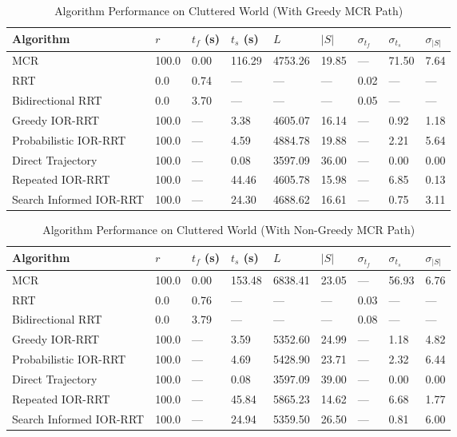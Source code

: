 \begin{table}[h!]
\centering
\begin{tabular}{@{}lllllllll@{}}
\toprule
Algorithm & $r$ & $t_f$ (s) & $t_s$ (s) & $L$ & $|S|$ & $\sigma_{t_f}$ & $\sigma_{t_s}$ & $\sigma_{|S|}$ \\
\midrule
MCR & 100.0 & 0.00 & 116.29 & 4753.26 & 19.85 & --- & 71.50 & 7.64 \\
RRT & 0.0 & 0.74 & --- & --- & --- & 0.02 & --- & --- \\
Bidirectional RRT & 0.0 & 3.70 & --- & --- & --- & 0.05 & --- & --- \\
Greedy IOR-RRT & 100.0 & --- & 3.38 & 4605.07 & 16.14 & --- & 0.92 & 1.18 \\
Probabilistic IOR-RRT & 100.0 & --- & 4.59 & 4884.78 & 19.88 & --- & 2.21 & 5.64 \\
Direct Trajectory & 100.0 & --- & 0.08 & 3597.09 & 36.00 & --- & 0.00 & 0.00 \\
Repeated IOR-RRT & 100.0 & --- & 44.46 & 4605.78 & 15.98 & --- & 6.85 & 0.13 \\
Search Informed IOR-RRT & 100.0 & --- & 24.30 & 4688.62 & 16.61 & --- & 0.75 & 3.11 \\
\bottomrule
\end{tabular}
\caption{Algorithm Performance on Cluttered World (With Greedy MCR Path)}
\label{tab:cluttered_world}
\end{table}

\begin{table}[h!]
\centering
\begin{tabular}{@{}lllllllll@{}}
\toprule
Algorithm & $r$ & $t_f$ (s) & $t_s$ (s) & $L$ & $|S|$ & $\sigma_{t_f}$ & $\sigma_{t_s}$ & $\sigma_{|S|}$ \\
\midrule
MCR & 100.0 & 0.00 & 153.48 & 6838.41 & 23.05 & --- & 56.93 & 6.76\\
RRT & 0.0 & 0.76 & --- & --- & --- & 0.03 & --- & --- \\
Bidirectional RRT & 0.0 & 3.79 & --- & --- & --- & 0.08 & --- & --- \\
Greedy IOR-RRT & 100.0 & --- & 3.59 & 5352.60 & 24.99 & --- & 1.18 & 4.82 \\
Probabilistic IOR-RRT & 100.0 & --- & 4.69 & 5428.90 & 23.71 & --- & 2.32 & 6.44 \\
Direct Trajectory & 100.0 & --- & 0.08 & 3597.09 & 39.00 & --- & 0.00 & 0.00 \\
Repeated IOR-RRT & 100.0 & --- & 45.84 & 5865.23 & 14.62 & --- & 6.68 & 1.77 \\
Search Informed IOR-RRT & 100.0 & --- & 24.94 & 5359.50 & 26.50 & --- & 0.81 & 6.00 \\
\bottomrule
\end{tabular}
\caption{Algorithm Performance on Cluttered World (With Non-Greedy MCR Path)}
\label{tab:top_light_cluttered_world}
\end{table}

\clearpage
\newpage
